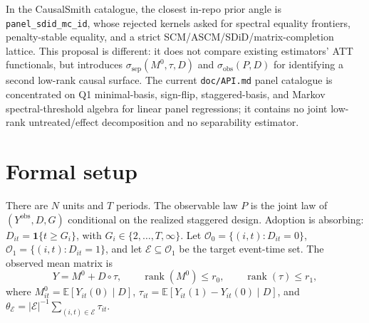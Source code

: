 \documentclass[11pt]{article}
\newcommand{\E}{\mathbb{E}}
\newcommand{\one}{\mathbf{1}}
\theoremstyle{definition}
\theoremstyle{plain}
\theoremstyle{remark}
\begin{document}
In the CausalSmith catalogue, the closest in-repo prior angle is \texttt{panel\_sdid\_mc\_id}, whose rejected kernels asked for spectral equality frontiers, penalty-stable equality, and a strict SCM/ASCM/SDiD/matrix-completion lattice.  This proposal is different: it does not compare existing estimators' ATT functionals, but introduces \(\sigma_{\mathrm{sep}}(M^0,\tau,D)\) and \(\sigma_{\mathrm{obs}}(P,D)\) for identifying a second low-rank causal surface.  The current \texttt{doc/API.md} panel catalogue is concentrated on Q1 minimal-basis, sign-flip, staggered-basis, and Markov spectral-threshold algebra for linear panel regressions; it contains no joint low-rank untreated/effect decomposition and no separability estimator.

\section{Formal setup}\label{sec:setup}
There are \(N\) units and \(T\) periods.  The observable law \(P\) is the joint law of \((Y^{\mathrm{obs}},D,G)\) conditional on the realized staggered design.  Adoption is absorbing: \(D_{it}=\one\{t\ge G_i\}\), with \(G_i\in\{2,\ldots,T,\infty\}\).  Let \(\mathcal O_0=\{(i,t):D_{it}=0\}\), \(\mathcal O_1=\{(i,t):D_{it}=1\}\), and let \(\mathcal E\subseteq\mathcal O_1\) be the target event-time set.  The observed mean matrix is
\[
Y=M^0+D\circ\tau,\qquad \operatorname{rank}(M^0)\le r_0,\qquad \operatorname{rank}(\tau)\le r_1,
\]
where \(M^0_{it}=\E[Y_{it}(0)\mid D]\), \(\tau_{it}=\E[Y_{it}(1)-Y_{it}(0)\mid D]\), and \(\theta_{\mathcal E}=|\mathcal E|^{-1}\sum_{(i,t)\in\mathcal E}\tau_{it}\).
\end{document}
